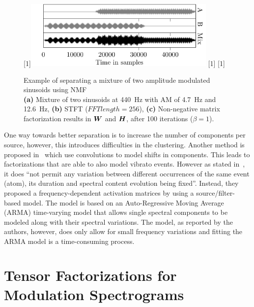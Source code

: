 \begin{figure}[H]
\centering
{}%
[1\textwidth]{\includegraphics[width=0.84\textwidth]{Chapters/05_Separation_Known/figures/Timepdf-crop.pdf}}%
\hspace{0.2\textwidth} %
[1\textwidth]{}%
\hspace{0.3\textwidth} %
[1\textwidth]{}%
\caption{Example of separating a mixture of two amplitude modulated sinusoids using \acs{NMF}\\ \textbf{(a)} Mixture of two sinusoids at \SI{440}{\hertz} with AM of \SI{4.7}{\hertz} and \SI{12.6}{\hertz}, \textbf{(b)} \acs{STFT} ($FFT length = 256$), \textbf{(c)} Non-negative matrix factorization results in ${\bm{W}}$ and ${\bm{H}}$, after 100 iterations ($\beta = 1$).}
\label{fig:am_tensor_nmf}
\end{figure}

One way towards better separation is to increase the number of components per source, however, this introduces difficulties in the clustering.
Another method is proposed in~\cite{smaragdis04, fitzgerald05s, jaiswal13, rodriguezserrano16} which use convolutions to model shifts in components.
This leads to factorizations that are able to also model vibrato events.
However as stated in~\cite{hennequin11}, it does ``not  permit  any variation  between  different  occurrences  of  the  same event (atom), its duration and spectral content evolution being fixed''. 
Instead, they proposed a frequency-dependent activation matrices by using a source/filter-based model.
The model is based on an Auto-Regressive Moving Average (ARMA) time-varying model that allows single spectral components to be modeled along with their spectral variations. 
The model, as reported by the authors, however, does only allow for small frequency variations and fitting the ARMA model is a time-consuming process.

\section{Tensor Factorizations for Modulation Spectrograms}
\label{sub:am}

